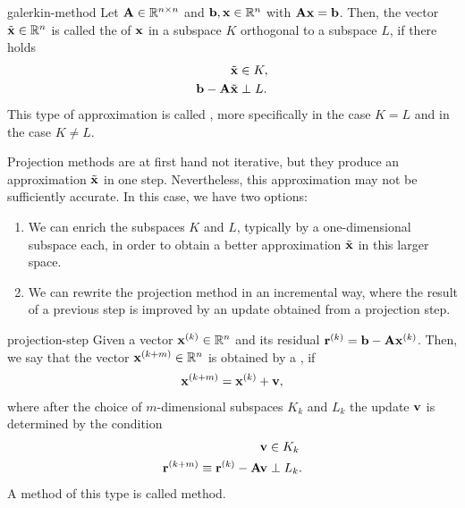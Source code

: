 \begin{Definition}{galerkin-method}
  Let $\mathbf A\in\mathbb R^{n\times n}$ and $\mathbf b, \mathbf x\in\mathbb R^n$ with $\mathbf A\mathbf x=\mathbf b$. Then,
  the vector $\tilde{\mathbf x}\in\mathbb R^n$ is called the  of $\mathbf x$ in a subspace $K$ orthogonal to a subspace
  $L$, if there holds
  \begin{align}
    \tilde{\mathbf x} &\in K,\\
    \mathbf b-\mathbf A\tilde{\mathbf x} &\perp L.
                         \label{eq:proj-it:1}
  \end{align}
  This type of approximation is called , more
  specifically  in the case $K=L$ and
   in the case $K\neq L$.
\end{Definition}

\begin{remark}
  Projection methods are at first hand not iterative, but they produce
  an approximation $\tilde {\mathbf x}$ in one step. Nevertheless, this
  approximation may not be sufficiently accurate. In this case, we
  have two options:
  \begin{enumerate}
  \item We can enrich the subspaces $K$ and $L$, typically by a
    one-dimensional subspace each, in order to obtain a better
    approximation $\tilde {\mathbf x}$ in this larger space.
  \item We can rewrite the projection method in an incremental way,
    where the result of a previous step is improved by an update
    obtained from a projection step.
  \end{enumerate}
\end{remark}

\begin{Definition}{projection-step}
  Given a vector $\mathbf x^{(k)}\in\mathbb R^n$ and its residual
  $\mathbf r^{(k)}=\mathbf b-\mathbf A\mathbf x^{(k)}$. Then, we say that the vector
  $\mathbf x^{(k+m)}\in\mathbb R^n$ is obtained by a , if
  \begin{gather}
    \mathbf x^{(k+m)} = \mathbf x^{(k)} + \mathbf v,
  \end{gather}
  where after the choice of $m$-dimensional subspaces $K_k$ and $L_k$ the update $\mathbf v$ is
  determined by the condition
  \begin{align}
    \mathbf v &\in K_k\\
    \mathbf r^{(k+m)} \equiv \mathbf r^{(k)} - \mathbf A\mathbf v &\perp L_k.
  \end{align}
  A method of this type is called  method.
\end{Definition}

